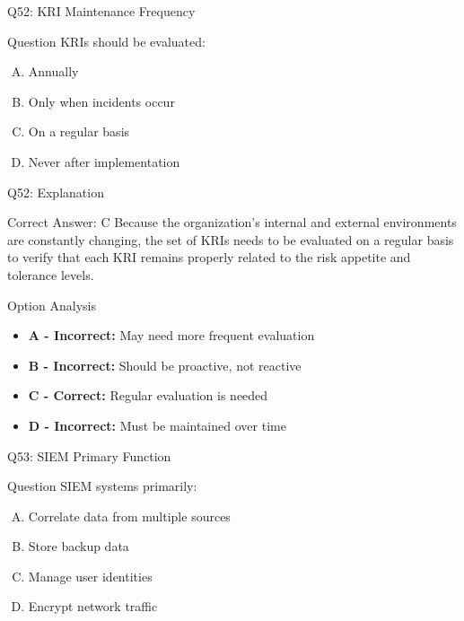 \documentclass{beamer}
\begin{document}
	
	
	
	\begin{frame}{Q52: KRI Maintenance Frequency}
		\begin{block}{Question}
			KRIs should be evaluated:
		\end{block}
		\begin{enumerate}[(A)]
			\item Annually
			\item Only when incidents occur
			\item On a regular basis
			\item Never after implementation
		\end{enumerate}
	\end{frame}
	
	\begin{frame}{Q52: Explanation}
		\begin{block}{Correct Answer: C}
			Because the organization's internal and external environments are constantly changing, the set of KRIs needs to be evaluated on a regular basis to verify that each KRI remains properly related to the risk appetite and tolerance levels.
		\end{block}
		\begin{block}{Option Analysis}
			\begin{itemize}
				\item \textbf{A - Incorrect:} May need more frequent evaluation
				\item \textbf{B - Incorrect:} Should be proactive, not reactive
				\item \textbf{C - Correct:} Regular evaluation is needed
				\item \textbf{D - Incorrect:} Must be maintained over time
			\end{itemize}
		\end{block}
	\end{frame}
	
	\begin{frame}{Q53: SIEM Primary Function}
		\begin{block}{Question}
			SIEM systems primarily:
		\end{block}
		\begin{enumerate}[(A)]
			\item Correlate data from multiple sources
			\item Store backup data
			\item Manage user identities
			\item Encrypt network traffic
		\end{enumerate}
	\end{frame}
	
\end{document}
